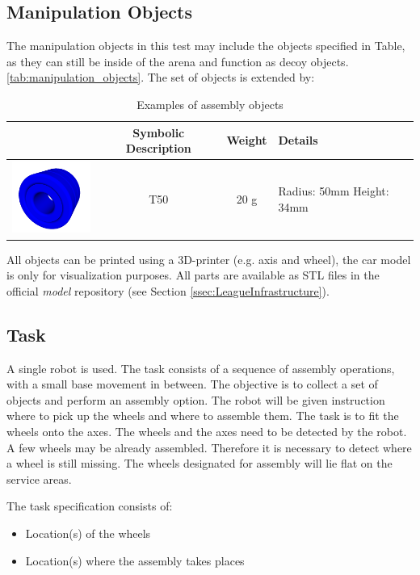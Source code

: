 \subsection{Manipulation Objects}
The manipulation objects in this test may include the objects specified in Table, as they can still be inside of the arena and function as decoy objects. \ref{tab:manipulation_objects}.
The set of objects is extended by:

\begin{table}[p]
\begin{tabular}{|c|c|c|p{5cm}|}
\hline 
 & Symbolic Description & Weight & Details \\ 
\hline 
\includegraphics[width=3cm]{./images/BAT_Tire.png}  & T50 & 20 g & Radius: 50mm \newline
 Height: 34mm \\
\hline 
\end{tabular} 

\label{tab:bat_objects}
\caption{Examples of assembly objects}
\end{table}

All objects can be printed using a 3D-printer (e.g. axis and wheel), the car model is only for visualization purposes. All parts are available as STL files in the official \RCAW \emph{model} repository (see Section \ref{ssec:LeagueInfrastructure}).


\subsection{Task}
A single robot is used. The task consists of a sequence of assembly operations, with a small base movement in between. The objective is to collect a set of objects and perform an assembly option. The robot will be given instruction where to pick up the wheels and where to assemble them. The task is to fit the wheels onto the axes. The wheels and the axes need to be detected by the robot. A few wheels may be already assembled. Therefore it is necessary to detect where a wheel is still missing. The wheels designated for assembly will lie flat on the service areas.

\par
The task specification consists of: 
\begin{itemize}
	\item Location(s) of the wheels
	\item Location(s) where the assembly takes places
\end{itemize}

